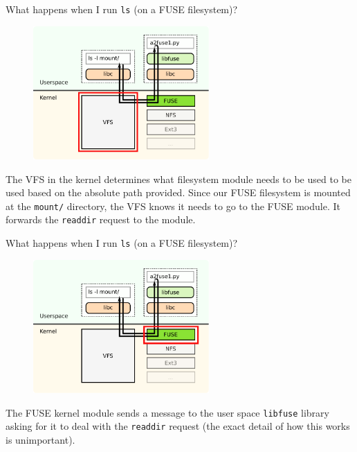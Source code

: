 \documentclass[notes]{beamer}
\begin{document}
\begin{frame}{What happens when I run \texttt{ls} (on a FUSE filesystem)?}
    \begin{figure}
        \centering
        \includegraphics[width=0.6\textwidth]{FUSE_structure_vfs.pdf}
    \end{figure}
    The VFS in the kernel determines what filesystem module needs to be used to be used based on the absolute path provided. Since our FUSE filesystem is mounted at the \texttt{mount/} directory, the VFS knows it needs to go to the FUSE module. It forwards the \texttt{readdir} request to the module.
\end{frame}
\begin{frame}{What happens when I run \texttt{ls} (on a FUSE filesystem)?}
    \begin{figure}
        \centering
        \includegraphics[width=0.6\textwidth]{FUSE_structure_fuse.pdf}
    \end{figure}
    The FUSE kernel module sends a message to the user space \texttt{libfuse} library asking for it to deal with the \texttt{readdir} request (the exact detail of how this works is unimportant).
\end{frame}
\end{document}
